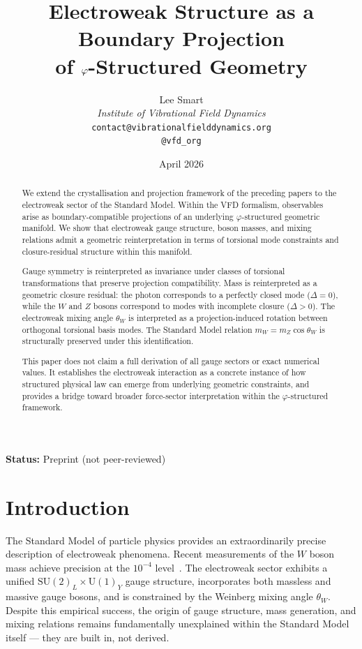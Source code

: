 \documentclass[12pt]{article}
\title{Electroweak Structure as a Boundary Projection\\of $\phig$-Structured Geometry}
\author{%
  Lee Smart\\[4pt]
  \textit{Institute of Vibrational Field Dynamics}\\[2pt]
  \texttt{contact@vibrationalfielddynamics.org}\\[2pt]
  \texttt{@vfd\_org}%
}
\date{April 2026}
\newcommand{\phig}{\varphi}
\begin{document}
\maketitle

\noindent\textbf{Status:} Preprint (not peer-reviewed)

\begin{abstract}
We extend the crystallisation and projection framework of the preceding papers to the electroweak sector of the Standard Model. Within the VFD formalism, observables arise as boundary-compatible projections of an underlying $\phig$-structured geometric manifold. We show that electroweak gauge structure, boson masses, and mixing relations admit a geometric reinterpretation in terms of torsional mode constraints and closure-residual structure within this manifold.

Gauge symmetry is reinterpreted as invariance under classes of torsional transformations that preserve projection compatibility. Mass is reinterpreted as a geometric closure residual: the photon corresponds to a perfectly closed mode ($\Delta = 0$), while the $W$ and $Z$ bosons correspond to modes with incomplete closure ($\Delta > 0$). The electroweak mixing angle $\theta_W$ is interpreted as a projection-induced rotation between orthogonal torsional basis modes. The Standard Model relation $m_W = m_Z \cos\theta_W$ is structurally preserved under this identification.

This paper does not claim a full derivation of all gauge sectors or exact numerical values. It establishes the electroweak interaction as a concrete instance of how structured physical law can emerge from underlying geometric constraints, and provides a bridge toward broader force-sector interpretation within the $\phig$-structured framework.
\end{abstract}

\section{Introduction}\label{sec:intro}

The Standard Model of particle physics provides an extraordinarily precise description of electroweak phenomena. Recent measurements of the $W$ boson mass achieve precision at the $10^{-4}$ level~\citep{CMS2024}. The electroweak sector exhibits a unified $\mathrm{SU}(2)_L \times \mathrm{U}(1)_Y$ gauge structure, incorporates both massless and massive gauge bosons, and is constrained by the Weinberg mixing angle $\theta_W$. Despite this empirical success, the origin of gauge structure, mass generation, and mixing relations remains fundamentally unexplained within the Standard Model itself --- they are built in, not derived.
\end{document}
